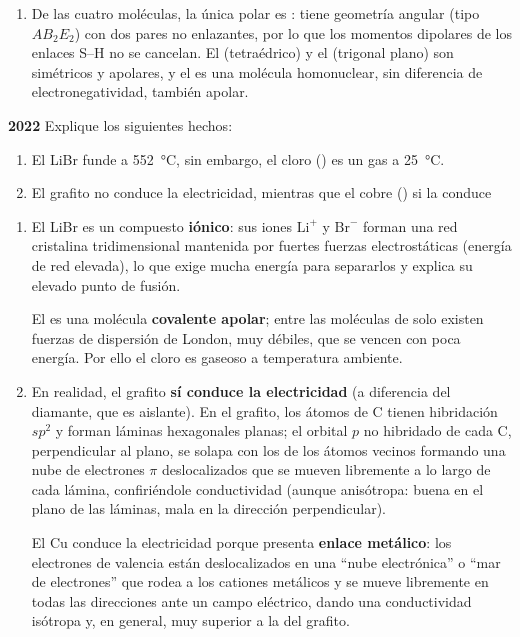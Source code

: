 \begin{exerciseEVAU}
\begin{solu}
\begin{enumerate}[label=\letraminuscula]
            \item De las cuatro moléculas, la única polar es \textbf{}: tiene geometría angular (tipo \(AB_2E_2\)) con dos pares no enlazantes, por lo que los momentos dipolares de los enlaces S--H no se cancelan. El  (tetraédrico) y el  (trigonal plano) son simétricos y apolares, y el  es una molécula homonuclear, sin diferencia de electronegatividad, también apolar.
        \end{enumerate}
    \end{solu}
\end{exerciseEVAU}


\begin{exerciseEVAU}
    \textbf{2022}
    Explique los siguientes hechos:
    \begin{enumerate}[label=\letraminuscula]
        \item El LiBr funde a \qty{552}{\degreeCelsius}, sin embargo, el cloro () es un gas a \qty{25}{\degreeCelsius}.
        \item El grafito no conduce la electricidad, mientras que el cobre () si la conduce
    \end{enumerate}

    \begin{solu}
        \begin{enumerate}[label=\letraminuscula]
            \item El LiBr es un compuesto \textbf{iónico}: sus iones \(\text{Li}^+\) y \(\text{Br}^-\) forman una red cristalina tridimensional mantenida por fuertes fuerzas electrostáticas (energía de red elevada), lo que exige mucha energía para separarlos y explica su elevado punto de fusión.

            El  es una molécula \textbf{covalente apolar}; entre las moléculas de  solo existen fuerzas de dispersión de London, muy débiles, que se vencen con poca energía. Por ello el cloro es gaseoso a temperatura ambiente.

            \item En realidad, el grafito \textbf{sí conduce la electricidad} (a diferencia del diamante, que es aislante). En el grafito, los átomos de C tienen hibridación \(sp^2\) y forman láminas hexagonales planas; el orbital \(p\) no hibridado de cada C, perpendicular al plano, se solapa con los de los átomos vecinos formando una nube de electrones \(\pi\) deslocalizados que se mueven libremente a lo largo de cada lámina, confiriéndole conductividad (aunque anisótropa: buena en el plano de las láminas, mala en la dirección perpendicular).

            El Cu conduce la electricidad porque presenta \textbf{enlace metálico}: los electrones de valencia están deslocalizados en una ``nube electrónica'' o ``mar de electrones'' que rodea a los cationes metálicos y se mueve libremente en todas las direcciones ante un campo eléctrico, dando una conductividad isótropa y, en general, muy superior a la del grafito.
        \end{enumerate}
    \end{solu}
\end{exerciseEVAU}


